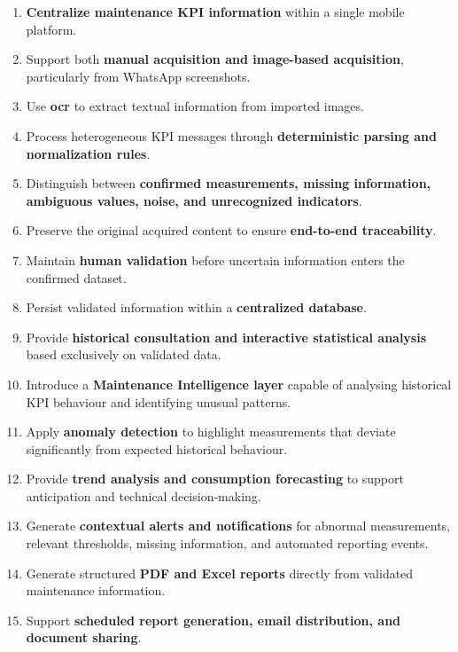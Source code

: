 \begin{enumerate}[label=\textbf{\arabic*.}]
    \item \textbf{Centralize maintenance KPI information} within a single mobile platform.

    \item Support both \textbf{manual acquisition and image-based acquisition}, particularly from WhatsApp screenshots.

    \item Use \textbf{\gls{ocr}} to extract textual information from imported images.

    \item Process heterogeneous KPI messages through \textbf{deterministic parsing and normalization rules}.

    \item Distinguish between \textbf{confirmed measurements, missing information, ambiguous values, noise, and unrecognized indicators}.

    \item Preserve the original acquired content to ensure \textbf{end-to-end traceability}.

    \item Maintain \textbf{human validation} before uncertain information enters the confirmed dataset.

    \item Persist validated information within a \textbf{centralized database}.

    \item Provide \textbf{historical consultation and interactive statistical analysis} based exclusively on validated data.

    \item Introduce a \textbf{Maintenance Intelligence layer} capable of analysing historical KPI behaviour and identifying unusual patterns.

    \item Apply \textbf{anomaly detection} to highlight measurements that deviate significantly from expected historical behaviour.

    \item Provide \textbf{trend analysis and consumption forecasting} to support anticipation and technical decision-making.

    \item Generate \textbf{contextual alerts and notifications} for abnormal measurements, relevant thresholds, missing information, and automated reporting events.

    \item Generate structured \textbf{PDF and Excel reports} directly from validated maintenance information.

    \item Support \textbf{scheduled report generation, email distribution, and document sharing}.
\end{enumerate}


